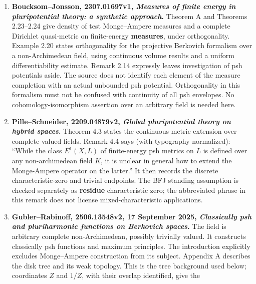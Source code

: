 \documentclass[
  11pt,
]{article}
\begin{document}
\begin{enumerate}
{{  theory over a trivially valued field}.} Theorem A gives the
  finite-energy operator and an embedding with dense image; surjectivity
  holds for smooth \(X\) when the characteristic is zero or the
  dimension is at most two. The ground field in this formulation is
  algebraically closed and \textbf{trivially valued}. It cannot be
  applied to our nontrivially valued field by changing that standing
  assumption.
\item
  \textbf{Boucksom--Jonsson, 2307.01697v1, \emph{Measures of finite
  energy in pluripotential theory: a synthetic approach}.} Theorem A and
  Theorems 2.23--2.24 give density of test Monge--Ampere measures and a
  complete Dirichlet quasi-metric on finite-energy \textbf{measures},
  under orthogonality. Example 2.20 states orthogonality for the
  projective Berkovich formalism over a non-Archimedean field, using
  continuous volume results and a uniform differentiability estimate.
  Remark 2.14 expressly leaves investigation of psh potentials aside.
  The source does not identify each element of the measure completion
  with an actual unbounded psh potential. Orthogonality in this
  formalism must not be confused with continuity of all psh envelopes.
  No cohomology-isomorphism assertion over an arbitrary field is needed
  here.
\item
  \textbf{Pille--Schneider, 2209.04879v2, \emph{Global pluripotential
  theory on hybrid spaces}.} Theorem 4.3 states the continuous-metric
  extension over complete valued fields. Remark 4.4 says (with
  typography normalized): ``While the class \(E^1(X,L)\) of
  finite-energy psh metrics on \(L\) is defined over any non-archimedean
  field \(K\), it is unclear in general how to extend the Monge-Ampere
  operator on the latter.'' It then records the discrete
  characteristic-zero and trivial endpoints. The BFJ standing assumption
  is checked separately as \textbf{residue} characteristic zero; the
  abbreviated phrase in this remark does not license
  mixed-characteristic applications.
\item
  \textbf{Gubler--Rabinoff, 2506.13548v2, 17 September 2025,
  \emph{Classically psh and pluriharmonic functions on Berkovich
  spaces}.} The field is arbitrary complete non-Archimedean, possibly
  trivially valued. It constructs classically psh functions and maximum
  principles. The introduction explicitly excludes Monge--Ampere
  construction from its subject. Appendix A describes the disk tree and
  its weak topology. This is the tree background used below; coordinates
  \(Z\) and \(1/Z\), with their overlap identified, give the

\end{enumerate}
\end{document}
